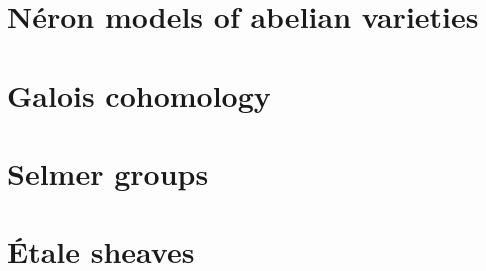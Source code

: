 



\section{N\'eron models of abelian varieties}






\section{Galois cohomology}







\section{Selmer groups}



\section{\'Etale sheaves}

